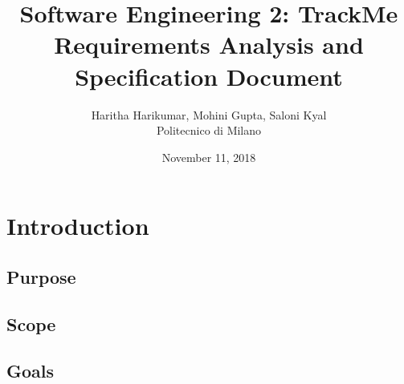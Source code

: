\documentclass[12pt, a4paper]{report}
\begin{document}
\title{Software Engineering 2: TrackMe \\ \vspace{1em} Requirements Analysis and Specification Document}
\author{Haritha Harikumar, Mohini Gupta, Saloni Kyal\\
Politecnico di Milano}
\date{November 11, 2018}
\maketitle
\tableofcontents

\chapter{Introduction}
\label{ch:introduction}

\section{Purpose}


\section{Scope}


\section{Goals}


%

%

%

\end{document}
